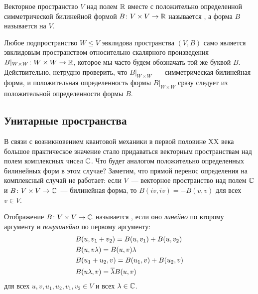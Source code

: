 \begin{definition}
Векторное пространство $V$ над полем $\mathbb R$ вместе с положительно
определенной симметрической билинейной формой $B\colon V\times V\to\mathbb
R$ называется , а форма $B$ называется
 на $V$.
\end{definition}

\begin{remark}\label{rem:euclidean_subspace}
Любое подпространство $W\leq V$ эвклидова пространства $(V,B)$ само
является эвклидовым пространством относительно скалярного произведения
$B|_{W\times W}\colon W\times W\to\mathbb R$, которое мы часто будем
обозначать той же буквой $B$. Действительно, нетрудно проверить, что
$B|_{W\times W}$~--- симметрическая билинейная форма, и положительная
определенность формы $B|_{W\times W}$ сразу следует из положительной
определенности формы $B$.
\end{remark}

\subsection{Унитарные пространства}


В связи с возникновением квантовой механики в первой половине XX века
большое практическое значение стало придаваться векторным
пространствам над полем комплексных чисел $\mathbb C$.
Что будет аналогом положительно определенных билинейных форм в этом
случае? Заметим, что прямой перенос определения на комплексный случай
не работает: если $V$~--- векторное пространство над полем $\mathbb C$ и
$B\colon V\times V\to\mathbb C$~--- билинейная форма, то
$B(iv,iv) = -B(v,v)$ для всех $v\in V$.

\begin{definition}
Отображение $B\colon V\times V\to\mathbb C$ называется
, если оно
{\it линейно} по второму аргументу и
{\it полулинейно} по первому аргументу:
\begin{align*}
&B(u,v_1+v_2) = B(u,v_1) + B(u,v_2)\\
&B(u,v\lambda) = B(u,v)\lambda\\
&B(u_1+u_2,v) = B(u_1,v) + B(u_2,v)\\
&B(u\lambda,v) = \overline\lambda B(u,v)
\end{align*}
для всех $u,v,u_1,u_2,v_1,v_2\in V$ и всех $\lambda\in\mathbb C$.
\end{definition}

